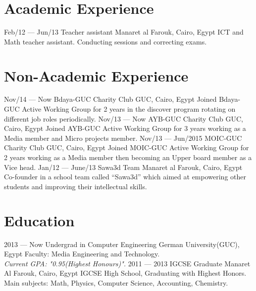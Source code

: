 \documentclass[]{friggeri-cv}
\begin{document}
\section{Academic Experience}
\begin{entrylist}
  \entry
    {Feb/12 — Jun/13}
    {Teacher assistant}
    {Manaret al Farouk, Cairo, Egypt}
    {ICT and Math teacher assistant. Conducting sessions and correcting exams.}
\end{entrylist}

\section{Non-Academic Experience}
\begin{entrylist}
  \entry
    {Nov/14 — Now}
    {Bdaya-GUC Charity Club}
    {GUC, Cairo, Egypt}
    {Joined Bdaya-GUC Active Working Group for 2 years in the discover program rotating on different job roles periodically.}
  \entry
    {Nov/13 — Now}
    {AYB-GUC Charity Club}
    {GUC, Cairo, Egypt}
    {Joined AYB-GUC Active Working Group for 3 years working as a Media member and Micro projects member.}
  \entry
    {Nov/13 — Jun/2015}
    {MOIC-GUC Charity Club}
    {GUC, Cairo, Egypt}
    {Joined MOIC-GUC Active Working Group for 2 years working as a Media member then becoming an Upper board member as a Vice head.}
  \entry
    {Jan/12 — June/13}
    {Sawa3d Team}
    {Manaret al Farouk, Cairo, Egypt}
    {Co-founder in a school team called “Sawa3d” which aimed at empowering other students and improving their intellectual skills.}
    
\end{entrylist}

\section{Education}
\begin{entrylist}
  \entry
    {2013 — Now}
    {Undergrad in Computer Engineering}
    {German University(GUC), Egypt}
    {Faculty: Media Engineering and Technology.\\
    \emph{Current GPA: "0.95(Highest Honours)".}}
  \entry
    {2011 — 2013}
    {IGCSE Graduate }
    {Manaret Al Farouk, Cairo, Egypt}
    {IGCSE High School, Graduating with Highest Honors.\\
    Main subjects: Math, Physics, Computer Science, Accounting, Chemistry.}
\end{entrylist}
\end{document}
